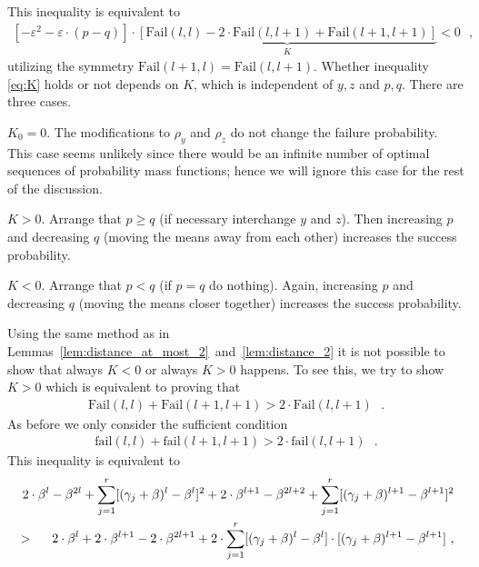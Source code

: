 \let\accentvec\vec \documentclass{llncs}
\newcommand{\pmf}{\ensuremath{{\rho}}}
\newcommand{\eps}{\ensuremath{\varepsilon}}
\newcommand{\blank}{\text{ }}
\newcommand{\low}{\ensuremath{l}}
\newcommand{\Fail}{\mathrm{Fail}}
\newcommand{\fail}{\mathrm{fail}}
\newcommand{\bl}{\beta}
\newcommand{\hf}{\gamma}
\begin{document}
This inequality is equivalent to
\begin{align}
\label{eq:K}
 [-\eps^2 -\eps\cdot(p-q)]\cdot \underbrace{[ \Fail(\low,\low) -2\cdot \Fail(\low,\low+1) + \Fail(\low+1,\low+1) ]}_K < 0 \blank,
\end{align}
utilizing the symmetry $\Fail(\low+1,\low)=\Fail(\low,\low+1)$. Whether inequality \eqref{eq:K} holds or not
depends on $K$, which is independent of $y,z$ and $p,q$. There are three cases.
\begin{compactitem}
 \item[$K_0=0$.] The modifications to $\pmf_y$ and $\pmf_z$ do not change the failure probability.
 This case seems unlikely since there would be an infinite number of optimal sequences of probability mass functions;
 hence we will ignore this case for the rest of the discussion.
\item[$K>0$.] Arrange that $p\geq q$ (if necessary interchange $y$ and $z$). Then increasing $p$ and decreasing $q$
 (moving the means away from each other) increases the success probability.
\item[$K<0$.] Arrange that $p<q$ (if $p=q$ do nothing). Again, increasing $p$ and decreasing $q$
(moving the means closer together) increases the success probability.
\end{compactitem}
Using the same method as in Lemmas~\ref{lem:distance_at_most_2}~and~\ref{lem:distance_2} 
it is not possible to show that always $K<0$ or always $K>0$ happens.
To see this, we try to show $K>0$ which is equivalent to proving that
\begin{align}
\label{eq:FAIL_last}
 \Fail(\low,\low)+\Fail(\low+1,\low+1)> 2\cdot \Fail(\low,\low+1) \blank.
\end{align}
As before we only consider the sufficient condition
\begin{align}
\label{eq:fail_last}
\fail(\low,\low)+\fail(\low+1,\low+1)> 2\cdot \fail(\low,\low+1) \blank.
\end{align}
This inequality is equivalent to
\begin{align*}
   \ 2 \cdot \bl^\low     - \bl^{2\low}   + \sum_{j=1}^r [(\hf_j+\bl)^\low    -\bl^\low]^2
 +2 \cdot \bl^{\low+1} - \bl^{2\low+2} + \sum_{j=1}^r [(\hf_j+\bl)^{\low+1}-\bl^{\low+1}]^2 \\
> \hspace{0.5cm} 2 \cdot \bl^\low + 2\cdot \bl^{\low+1} - 2\cdot \bl^{2\low+1} + 2\cdot\sum_{j=1}^r [(\hf_j+\bl)^{\low}-\bl^{\low}]\cdot [(\hf_j+\bl)^{\low+1}-\bl^{\low+1}] \blank,
\end{align*}
\end{document}
